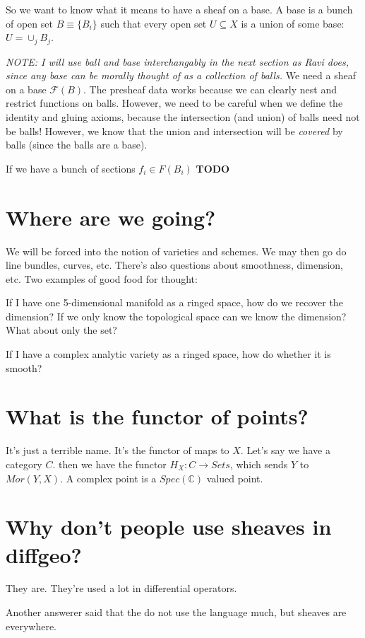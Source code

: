 \documentclass{book}
\newcommand{\F}{\ensuremath{\mathcal{F}}}
\newcommand{\Spec}{\ensuremath{Spec}}
\theoremstyle{definition}
\begin{document}
So we want to know what it means to have a sheaf on a base. A base is a bunch
of open set $B \equiv \{ B_i \}$ such that every open set $U \subseteq X$
is a union of some base: $U = \cup_j B_j$. 

\emph{NOTE: I will use ball and base interchangably in the next section as Ravi does, 
since any base can be morally thought of as a collection of balls.}
We need a  sheaf on a base $\F(B)$. The presheaf data works because we can
clearly nest and restrict functions on balls. 
However, we need to be careful when we define the identity and gluing axioms,
because the intersection (and union) of balls need not be balls! However,
we know that the union and intersection will be \emph{covered} by balls (since
the balls are a base).

If we have a bunch of sections $f_i \in F(B_i)$ \textbf{TODO}

\section{Where are we going?}
We will be forced into the notion of varieties and schemes. We may then
go do line bundles, curves, etc. There's also questions about smoothness, dimension,
etc. Two examples of good food for thought:

If I have one 5-dimensional manifold as a ringed space, how do we recover the
dimension? If we only know the topological space can we know the dimension?
What about only the set?

If I have a complex analytic variety as a ringed space, how do whether it is
smooth?

\section{What is the functor of points?}

It's just a terrible name. It's the functor of maps to $X$. Let's say we have
a category $C$. then we have the functor $H_X: C \rightarrow Sets$, which
sends $Y$ to $Mor(Y, X)$. A complex point is a $\Spec(\mathbb C)$ valued point.

\section{Why don't people use sheaves in diffgeo?}
They are. They're used a lot in differential operators.

Another answerer said that the do not use the language much, but sheaves are
everywhere.
\end{document}
